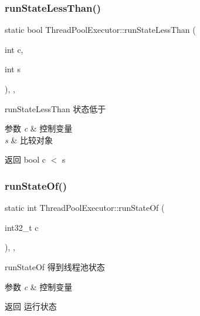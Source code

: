 \subsubsection{\texorpdfstring{run\+State\+Less\+Than()}{runStateLessThan()}}
{\footnotesize\ttfamily static bool Thread\+Pool\+Executor\+::run\+State\+Less\+Than (\begin{DoxyParamCaption}\item[{int}]{c,  }\item[{int}]{s }\end{DoxyParamCaption})\hspace{0.3cm}{\ttfamily [inline]}, {\ttfamily [static]}, {\ttfamily [protected]}}



run\+State\+Less\+Than 状态低于 


\begin{DoxyParams}{参数}
{\em c} & 控制变量 \\
\hline
{\em s} & 比较对象\\
\hline
\end{DoxyParams}
\begin{DoxyReturn}{返回}
bool c $<$ s 
\end{DoxyReturn}
\mbox{\label{classThreadPoolExecutor_aa7ca2a35d562746df0d77bd043bb75f0}} 
\subsubsection{\texorpdfstring{run\+State\+Of()}{runStateOf()}}
{\footnotesize\ttfamily static int Thread\+Pool\+Executor\+::run\+State\+Of (\begin{DoxyParamCaption}\item[{int32\+\_\+t}]{c }\end{DoxyParamCaption})\hspace{0.3cm}{\ttfamily [inline]}, {\ttfamily [static]}, {\ttfamily [protected]}}



run\+State\+Of 得到线程池状态 


\begin{DoxyParams}{参数}
{\em c} & 控制变量\\
\hline
\end{DoxyParams}
\begin{DoxyReturn}{返回}
运行状态 
\end{DoxyReturn}
\mbox{\label{classThreadPoolExecutor_aaada9deadf7c0f72bca5076deaa8c92f}} 
